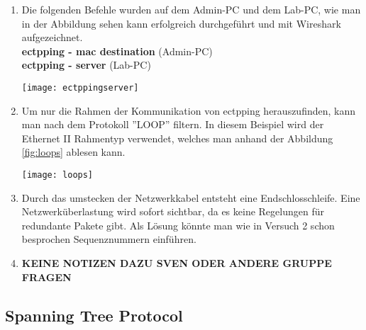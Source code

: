 \documentclass{scrartcl}
\begin{document}
  \renewcommand{\labelenumi}{\alph{enumi})}
  \begin{enumerate}
  \item
  Die folgenden Befehle wurden auf dem Admin-PC und dem Lab-PC, wie man in der Abbildung sehen kann erfolgreich durchgeführt und mit Wireshark aufgezeichnet.\\
  \textbf{ectpping - mac destination} (Admin-PC)\\
  \textbf{ectpping - server} (Lab-PC)
  
    \texttt{[image: ectppingserver]}
    \label{fig:ectppingserver}
  
  \item
  Um nur die Rahmen der Kommunikation von ectpping herauszufinden, kann man nach dem Protokoll ''LOOP'' filtern. In diesem Beispiel wird der Ethernet II Rahmentyp verwendet, welches man anhand der Abbildung \ref{fig:loops} ablesen kann.
  
    \texttt{[image: loops]}
    \label{fig:loops}
  
  \item
  Durch das umstecken der Netzwerkkabel entsteht eine Endschlosschleife. Eine Netzwerküberlastung wird sofort sichtbar, da es keine Regelungen für redundante Pakete gibt. Als Lösung könnte man wie in Versuch 2 schon besprochen Sequenznummern einführen.
  
  \item
 \textbf{KEINE NOTIZEN DAZU  SVEN ODER ANDERE GRUPPE FRAGEN}
 \end{enumerate}
 
 \subsection[Aufgabe 5 Spanning Tree Protocol]{Spanning Tree Protocol}
 
\end{document}
